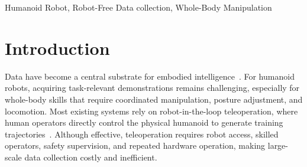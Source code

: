 \documentclass[letterpaper, 10 pt, conference]{ieeeconf}  %
\begin{document}
\begin{abstract}
High-quality demonstration data are essential for humanoid robot skill learning, especially for whole-body behaviors that require coordinated perception, locomotion, and manipulation. Existing data-collection methods largely rely on robot teleoperation, which is constrained by hardware accessibility, operator expertise, and limited efficiency. Inspired by the Universal Manipulation Interface (UMI), we propose \textbf{BifrostUMI}, a portable and robot-free framework for humanoid whole-body data collection. BifrostUMI uses lightweight VR devices and UMI-inspired grippers to collect sparse human keypoint trajectories, wrist-view observations, and gripper actions. These demonstrations train a high-level policy to predict future keypoints, which are retargeted to robot-native whole-body references and executed by a whole-body controller. Experiments in five real-world scenarios demonstrate the effectiveness of the proposed framework and validate the collected demonstrations for transferable humanoid whole-body skill learning. 
\noindent\textbf{Project page:}
\href{https://baai-aether.github.io/BifrostUMI/}
{\textcolor{projectred}{baai-aether.github.io/BifrostUMI}}


\end{abstract}
 

\begin{keywords}
Humanoid Robot, Robot-Free Data collection, Whole-Body Manipulation
\end{keywords}

\section{Introduction}

Data have become a central substrate for embodied intelligence~\cite{droid, twist2}. For humanoid robots, acquiring task-relevant demonstrations remains challenging, especially for whole-body skills that require coordinated manipulation, posture adjustment, and locomotion. Most existing systems rely on robot-in-the-loop teleoperation, where human operators directly control the physical humanoid to generate training trajectories~\cite{twist2,humanplus,clone,mobiletv,dreamtouch,h2p,omnih2o}. Although effective, teleoperation requires robot access, skilled operators, safety supervision, and repeated hardware operation, making large-scale data collection costly and inefficient.
\end{document}
